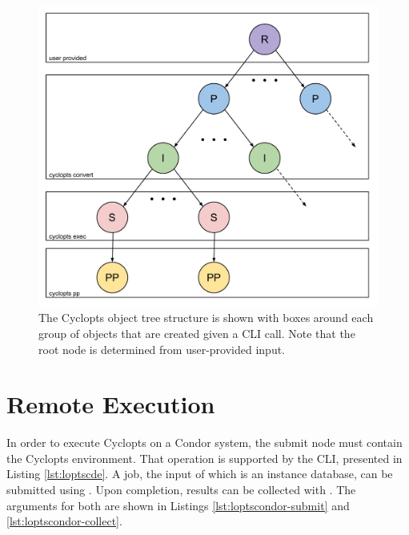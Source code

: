\begin{figure}
  \begin{center}
    \includegraphics[width=\textwidth]{./backmatter/figs/cyclopts_tree_cli.pdf}
    \caption[]{
      \label{fig:lopts_cli}
      The Cyclopts object tree structure is shown with boxes around each group
      of objects that are created given a CLI call. Note that the root node is
      determined from user-provided input.}
  \end{center}
\end{figure}

\section{Remote Execution}

In order to execute Cyclopts on a Condor system, the submit node must contain
the Cyclopts environment. That operation is supported by the 
CLI, presented in Listing \ref{lst:loptscde}. A job, the input of which is an
instance database, can be submitted using . Upon
completion, results can be collected with . The
arguments for both are shown in Listings \ref{lst:loptscondor-submit} and
\ref{lst:loptscondor-collect}.






